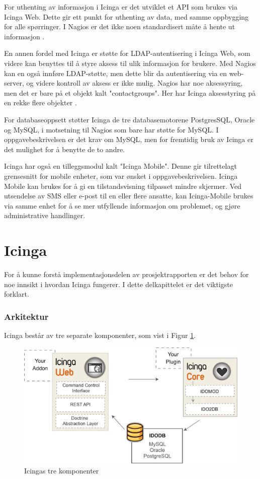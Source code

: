 For uthenting av informasjon i Icinga er det utviklet et API som brukes via Icinga Web. Dette gir ett punkt for uthenting av data, med samme oppbygging for alle spørringer. I Nagios er det ikke noen standardisert måte å hente ut informasjon \cite{icingaapi}. 

En annen fordel med Icinga er støtte for LDAP-autentisering i Icinga Web, som videre kan benyttes til å styre aksess til ulik informasjon for brukere. Med Nagios kan en også innføre LDAP-støtte, men dette blir da autentisering via en web-server, og videre kontroll av aksess er ikke mulig. Nagios har noe aksessyring, men det er bare på et objekt kalt "contactgroups". Her har Icinga aksesstyring på en rekke flere objekter \cite{icingaweb}.

For databaseoppsett støtter Icinga de tre databasemotorene PostgresSQL, Oracle og MySQL, i motsetning til Nagios som bare har støtte for MySQL. I oppgavebeskrivelsen er det krav om MySQL, men for fremtidig bruk av Icinga er det mulighet for å benytte de to andre.

Icinga har også en tilleggsmodul kalt "Icinga Mobile". Denne gir tilrettelagt grensesnitt for mobile enheter, som var ønsket i oppgavebeskrivelsen. Icinga Mobile kan brukes for å gi en tilstandsvisning tilpasset mindre skjermer. Ved utsendelse av SMS eller e-post til en eller flere ansatte, kan Icinga-Mobile brukes via samme enhet for å se mer utfyllende informasjon om problemet, og gjøre administrative handlinger.

\section{Icinga}
For å kunne forstå implementasjonsdelen av prosjektrapporten er det behov for noe innsikt i hvordan Icinga fungerer. I dette delkapittelet er det viktigste forklart.

\subsubsection{Arkitektur}
Icinga består av tre separate komponenter, som vist i Figur \ref{icingacomponents}.

\begin{figure}[H]
    \centering
    \includegraphics[scale=1.2]{img/icinga_architecture}
    \caption{Icingas tre komponenter}
    \label{icingacomponents}
\end{figure}


